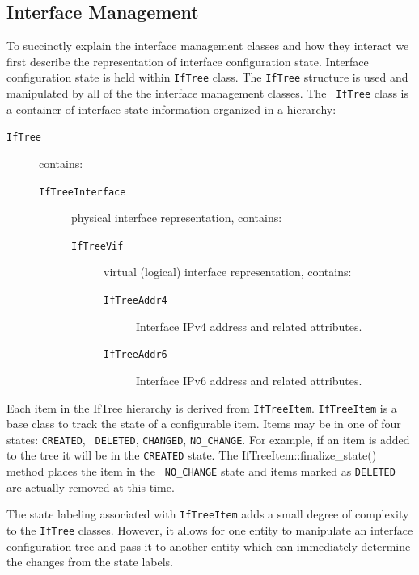 \documentclass[11pt]{article}
\begin{document}
\subsection{Interface Management}

To succinctly explain the interface management classes and how they
interact we first describe the representation of interface
configuration state.  Interface configuration state is held within
{\tt IfTree} class.  The {\tt IfTree} structure is used and
manipulated by all of the the interface management classes.  The {\tt
IfTree} class is a container of interface state information organized
in a hierarchy:

\begin{description}
\item [\tt IfTree] contains:
  \begin{description}
  \item [\tt IfTreeInterface] physical interface representation, contains:
    \begin{description}
    \item [\tt IfTreeVif] virtual (logical) interface representation, contains:
      \begin{description}
      \item [\tt IfTreeAddr4] Interface IPv4 address and related attributes.
      \item [\tt IfTreeAddr6] Interface IPv6 address and related attributes.
      \end{description}
    \end{description}
  \end{description}
\end{description}

Each item in the IfTree hierarchy is derived from {\tt IfTreeItem}.
{\tt IfTreeItem} is a base class to track the state of a configurable
item. Items may be in one of four states: {\tt CREATED}, {\tt
DELETED}, {\tt CHANGED}, {\tt NO\_CHANGE}.  For example, if an
item is added to the tree it will be in the {\tt CREATED} state.  The
{IfTreeItem::finalize\_state()} method places the item in the {\tt
NO\_CHANGE} state and items marked as {\tt DELETED} are actually
removed at this time.  

The state labeling associated with {\tt IfTreeItem} adds a small
degree of complexity to the {\tt IfTree} classes. However, it allows
for one entity to manipulate an interface configuration tree and pass
it to another entity which can immediately determine the changes from
the state labels.
\end{document}
